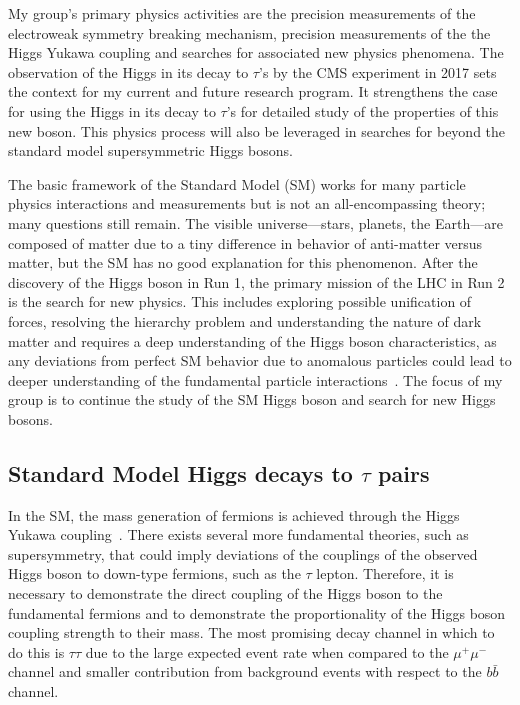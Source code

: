 \documentclass[preprint,12pt]{elsarticle}
\begin{document}
My group's primary physics activities are the precision measurements of the electroweak symmetry breaking mechanism, 
precision measurements of the the Higgs Yukawa coupling and searches for associated new physics phenomena. 
The observation of the Higgs in its decay to $\tau$'s by the CMS experiment in 2017 sets the context for my 
current and future research program. It strengthens the case for using the Higgs in its decay to $\tau$'s for 
detailed study of the properties of this new boson. 
This physics process will also be leveraged in searches for beyond the standard model supersymmetric Higgs bosons. 


The basic framework of the Standard Model (SM) works for many particle physics interactions and measurements but is not an all-encompassing theory; many questions still remain. The visible 
universe---stars, planets, the Earth---are composed of matter due to a tiny difference in behavior 
of anti-matter versus matter, but the SM has no good explanation for this phenomenon. %
After the discovery of the Higgs boson in Run 1, the primary mission of the LHC in Run 2 is 
the search for new physics. This includes exploring possible unification of forces, resolving the hierarchy problem 
and understanding the nature of dark matter and requires a 
deep understanding of the Higgs boson characteristics, as any deviations from perfect SM 
behavior due to anomalous particles could lead to deeper understanding of the fundamental particle 
interactions~\cite{Curtin:2013fra}. The focus of my group is to continue the study of the 
SM Higgs boson and search for new Higgs bosons. 

\subsection{Standard Model Higgs decays to $\tau$ pairs}
In the SM, the mass generation of fermions is achieved through the Higgs Yukawa coupling~\cite{Higgs:1966ev,Denner:2011mq}.
There exists several more fundamental theories, such as supersymmetry, %
that could imply deviations of the couplings of the observed Higgs boson to down-type fermions, such as
the $\tau$ lepton. Therefore, it is necessary to demonstrate the direct coupling of the Higgs boson to the fundamental fermions and to demonstrate
the proportionality of the Higgs boson coupling strength to their mass. 
The most promising decay channel in which to do this is 
$\tau\tau$ due to the large expected event rate when compared to the $\mu^{+}\mu^{-}$ 
channel and smaller contribution from background events with respect to the $b\bar{b}$ channel.
\end{document}
